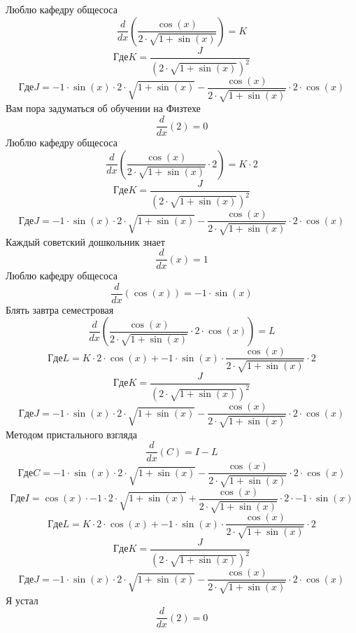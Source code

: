 \documentclass[12pt, a4paper]{article}
\begin{document}
Люблю кафедру общесоса
\begin{equation}
\frac{d}{dx}(\frac{\cos(x)}{2 \cdot \sqrt{1+\sin(x)}}) = K
\end{equation}
$$Где K = \frac{J}{{(2 \cdot \sqrt{1+\sin(x)})}^{2}}$$
$$Где J = -1 \cdot \sin(x) \cdot 2 \cdot \sqrt{1+\sin(x)}-\frac{\cos(x)}{2 \cdot \sqrt{1+\sin(x)}} \cdot 2 \cdot \cos(x)$$
Вам пора задуматься об обучении на Физтехе
\begin{equation}
\frac{d}{dx}(2) = 0
\end{equation}
Люблю кафедру общесоса
\begin{equation}
\frac{d}{dx}(\frac{\cos(x)}{2 \cdot \sqrt{1+\sin(x)}} \cdot 2) = K \cdot 2
\end{equation}
$$Где K = \frac{J}{{(2 \cdot \sqrt{1+\sin(x)})}^{2}}$$
$$Где J = -1 \cdot \sin(x) \cdot 2 \cdot \sqrt{1+\sin(x)}-\frac{\cos(x)}{2 \cdot \sqrt{1+\sin(x)}} \cdot 2 \cdot \cos(x)$$
Каждый советский дошкольник знает
\begin{equation}
\frac{d}{dx}(x) = 1
\end{equation}
Люблю кафедру общесоса
\begin{equation}
\frac{d}{dx}(\cos(x)) = -1 \cdot \sin(x)
\end{equation}
Блять завтра семестровая
\begin{equation}
\frac{d}{dx}(\frac{\cos(x)}{2 \cdot \sqrt{1+\sin(x)}} \cdot 2 \cdot \cos(x)) = L
\end{equation}
$$Где L = K \cdot 2 \cdot \cos(x)+-1 \cdot \sin(x) \cdot \frac{\cos(x)}{2 \cdot \sqrt{1+\sin(x)}} \cdot 2$$
$$Где K = \frac{J}{{(2 \cdot \sqrt{1+\sin(x)})}^{2}}$$
$$Где J = -1 \cdot \sin(x) \cdot 2 \cdot \sqrt{1+\sin(x)}-\frac{\cos(x)}{2 \cdot \sqrt{1+\sin(x)}} \cdot 2 \cdot \cos(x)$$
Методом пристального взгляда
\begin{equation}
\frac{d}{dx}(C) = I-L
\end{equation}
$$Где C = -1 \cdot \sin(x) \cdot 2 \cdot \sqrt{1+\sin(x)}-\frac{\cos(x)}{2 \cdot \sqrt{1+\sin(x)}} \cdot 2 \cdot \cos(x)$$
$$Где I = \cos(x) \cdot -1 \cdot 2 \cdot \sqrt{1+\sin(x)}+\frac{\cos(x)}{2 \cdot \sqrt{1+\sin(x)}} \cdot 2 \cdot -1 \cdot \sin(x)$$
$$Где L = K \cdot 2 \cdot \cos(x)+-1 \cdot \sin(x) \cdot \frac{\cos(x)}{2 \cdot \sqrt{1+\sin(x)}} \cdot 2$$
$$Где K = \frac{J}{{(2 \cdot \sqrt{1+\sin(x)})}^{2}}$$
$$Где J = -1 \cdot \sin(x) \cdot 2 \cdot \sqrt{1+\sin(x)}-\frac{\cos(x)}{2 \cdot \sqrt{1+\sin(x)}} \cdot 2 \cdot \cos(x)$$
Я устал
\begin{equation}
\frac{d}{dx}(2) = 0
\end{equation}
\end{document}
